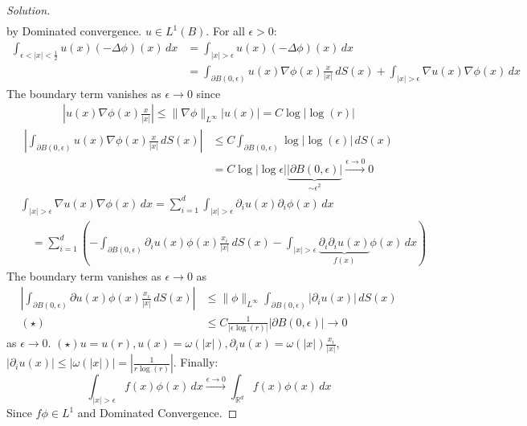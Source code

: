 \documentclass{report}
\theoremstyle{tommy}
\begin{document}
\begin{proof}[Solution]
\begin{align*}
    \end{align*}
    by Dominated convergence. \(u \in L^1(B)\). For all \(\epsilon > 0\):
    \begin{align*}
      \int_{\epsilon < |x| < \frac{1}{2}} u(x) (-\Delta \phi)(x) \, dx 
      &= \int_{|x|>\epsilon} u(x) (-\Delta \phi)(x) \, dx \\
      &= \int_{\partial B(0, \epsilon)}u(x) \nabla \phi(x) \frac{x}{|x|} \, dS(x) + \int_{|x| > \epsilon} \nabla u(x) \nabla \phi(x) \, dx
    \end{align*}
    The boundary term vanishes as \(\epsilon \to 0\) since 
    \begin{align*}
      \left|u(x) \nabla \phi(x) \frac{x}{|x|}\right| \le \|\nabla \phi \|_{L^\infty} |u(x)| = C \log|\log(r)|
    \end{align*}
    \begin{align*}
      \left| \int_{\partial B(0, \epsilon)} u(x) \nabla \phi(x) \frac{x}{|x|} \, dS(x) \right| 
      &\le C \int_{\partial B(0, \epsilon)} \log |\log(\epsilon)| \, dS(x) \\
      &= C \log |\log \epsilon| \underbrace{|\partial B(0, \epsilon)|}_{\sim \epsilon^2} \xrightarrow{\epsilon \to 0} 0
    \end{align*}
    \begin{align*}
      &\int_{|x|> \epsilon} \nabla u(x) \nabla \phi(x) \, dx 
      = \sum_{i=1}^d \int_{|x|> \epsilon} \partial_i u(x) \partial_i \phi(x) \, dx \\
      &\quad= \sum_{i=1}^d \left(- \int_{\partial B(0, \epsilon)} \partial_i u(x) \phi(x) \frac{x_i}{|x|} \, dS(x) - \int_{|x|> \epsilon} \underbrace{\partial_i \partial_i u(x)}_{f(x)} \phi(x) \, dx\right)
    \end{align*}
    The boundary term vanishes as \(\epsilon \to 0\) as 
    \begin{align*}
      \left| \int_{\partial B(0, \epsilon)} \partial u(x) \phi(x) \frac{x_i}{|x|}\, dS(x) \right|
      &\le \|\phi\|_{L^\infty} \int_{\partial B(0, \epsilon)} |\partial_i u(x)| \, dS(x) \\
      (\star) \quad &\le C \frac{1}{|\epsilon \log(r)|} |\partial B(0, \epsilon)| \to 0
    \end{align*} as \(\epsilon \to 0\). 
    \((\star) u = u(r), u(x) = \omega(|x|), \partial_i u(x) = \omega(|x|)\frac{x_i}{|x|}\), \(|\partial_i u(x)| \le |\omega(|x|)| = \left|\frac{1}{r\log(r)}\right|\). Finally:
    \begin{equation*}
      \int_{|x|> \epsilon} f(x) \phi(x) \, dx \xrightarrow{\epsilon \to 0} \int_{\mathbb{R}^d} f(x) \phi(x) \, dx
    \end{equation*}
    Since \(f \phi \in L^1\) and Dominated Convergence.
  \end{proof}
\end{document}

